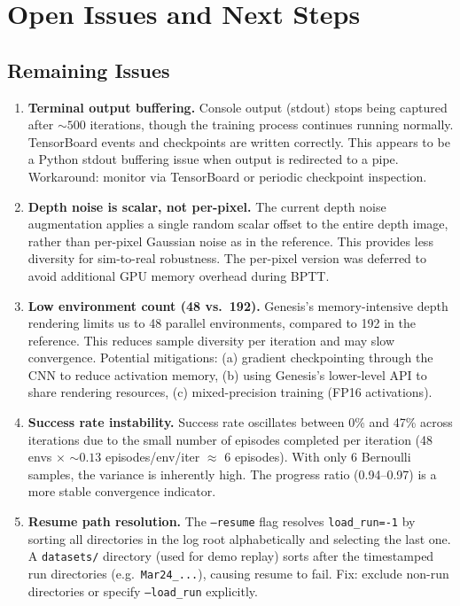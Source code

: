 \documentclass[11pt,a4paper]{article}
\begin{document}
\section{Open Issues and Next Steps}

\subsection{Remaining Issues}

\begin{enumerate}
  \item \textbf{Terminal output buffering.}
        Console output (stdout) stops being captured after ${\sim}500$ iterations,
        though the training process continues running normally. TensorBoard
        events and checkpoints are written correctly. This appears to be a
        Python stdout buffering issue when output is redirected to a pipe.
        Workaround: monitor via TensorBoard or periodic checkpoint inspection.

  \item \textbf{Depth noise is scalar, not per-pixel.}
        The current depth noise augmentation applies a single random scalar
        offset to the entire depth image, rather than per-pixel Gaussian noise
        as in the reference. This provides less diversity for sim-to-real
        robustness. The per-pixel version was deferred to avoid additional GPU
        memory overhead during BPTT.

  \item \textbf{Low environment count (48 vs.\ 192).}
        Genesis's memory-intensive depth rendering limits us to 48 parallel
        environments, compared to 192 in the reference. This reduces sample
        diversity per iteration and may slow convergence. Potential mitigations:
        (a) gradient checkpointing through the CNN to reduce activation memory,
        (b) using Genesis's lower-level API to share rendering resources,
        (c) mixed-precision training (FP16 activations).

  \item \textbf{Success rate instability.}
        Success rate oscillates between 0\% and 47\% across iterations due to
        the small number of episodes completed per iteration (48 envs $\times$
        ${\sim}0.13$ episodes/env/iter $\approx$ 6 episodes). With only 6
        Bernoulli samples, the variance is inherently high. The progress ratio
        (0.94--0.97) is a more stable convergence indicator.

  \item \textbf{Resume path resolution.}
        The \texttt{--resume} flag resolves \texttt{load\_run=-1} by sorting all
        directories in the log root alphabetically and selecting the last one. A
        \texttt{datasets/} directory (used for demo replay) sorts after the
        timestamped run directories (e.g.\ \texttt{Mar24\_...}), causing resume
        to fail. Fix: exclude non-run directories or specify \texttt{--load\_run}
        explicitly.
\end{enumerate}
\end{document}
